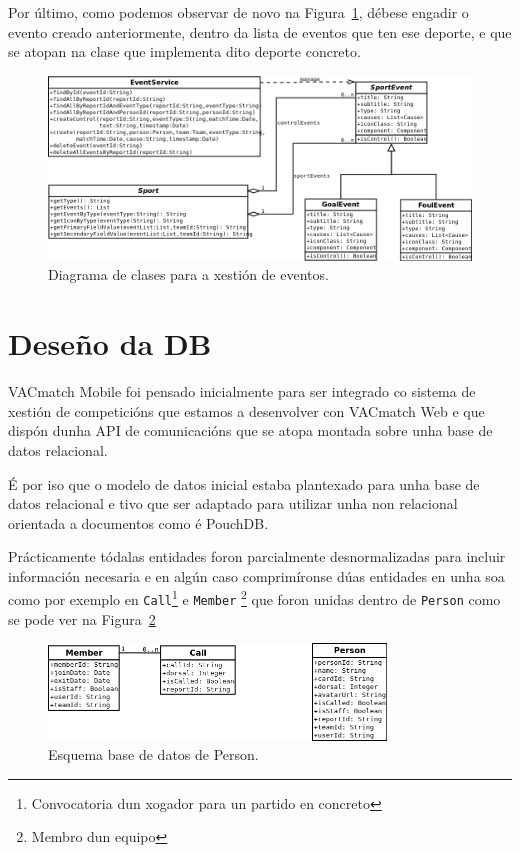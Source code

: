   Por último, como podemos observar de novo na 
Figura~\ref{fig:design:eventsdiagram}, débese engadir o evento creado 
anteriormente, dentro da lista de eventos que ten ese deporte, e que se atopan 
na clase que implementa dito deporte concreto.

    \begin{figure}[h!]
      \begin{center}
  \includegraphics[width=\textwidth]{./img/diagrams/events_diagram.png}
      \caption{Diagrama de clases para a xestión de eventos.}
      \label{fig:design:eventsdiagram}
      \end{center}
    \end{figure}


  \section{Deseño da DB}
  VACmatch Mobile foi pensado inicialmente para ser integrado co sistema de 
xestión de competicións que estamos a desenvolver con VACmatch Web e que dispón 
dunha API de comunicacións que se atopa montada sobre unha base de datos 
relacional.

  É por iso que o modelo de datos inicial estaba plantexado para unha base de 
datos relacional e tivo que ser adaptado para utilizar unha non relacional 
orientada a documentos como é PouchDB.

  Prácticamente tódalas entidades foron parcialmente desnormalizadas para 
incluir información necesaria e en algún caso comprimíronse dúas entidades en 
unha soa como por exemplo en \lstinline{Call}\footnote{Convocatoria dun xogador 
para un partido en concreto} e \lstinline{Member} \footnote{Membro dun equipo} 
que foron unidas 
dentro de \lstinline{Person} como se pode ver na 
Figura~\ref{fig:design:persondbdiagram}

    \begin{figure}[h!]
      \begin{center}
      \includegraphics[width=0.8\textwidth]{./img/diagrams/person_diagram.png}
      \caption{Esquema base de datos de Person.}
      \label{fig:design:persondbdiagram}
      \end{center}
    \end{figure}

